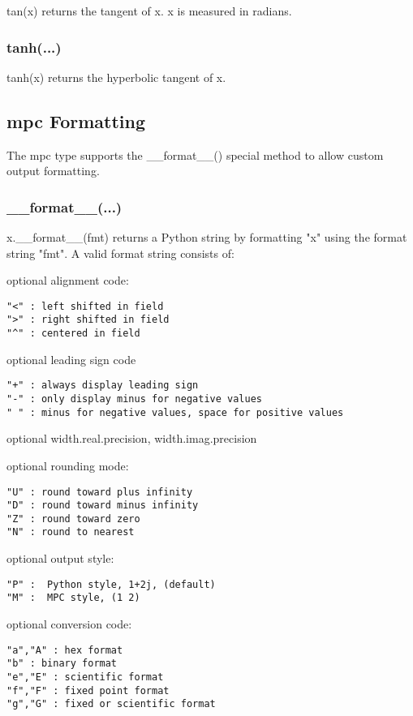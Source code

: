 tan(x) returns the tangent of x. x is measured in radians.

\subsubsection{tanh(...)}

tanh(x) returns the hyperbolic tangent of x.


\subsection{mpc Formatting}

The mpc type supports the \_\_format\_\_() special method to allow custom output formatting.

\subsubsection{\_\_format\_\_(...)}


x.\_\_format\_\_(fmt) returns a Python string by formatting "x" using the format string "fmt". A valid
format string consists of:


optional alignment code:

\begin{lstlisting}
"<" : left shifted in field
">" : right shifted in field
"^" : centered in field
\end{lstlisting}

optional leading sign code
\begin{lstlisting}
"+" : always display leading sign
"-" : only display minus for negative values
" " : minus for negative values, space for positive values
\end{lstlisting}

optional width.real.precision,  width.imag.precision

optional rounding mode:
\begin{lstlisting}
"U" : round toward plus infinity
"D" : round toward minus infinity
"Z" : round toward zero
"N" : round to nearest
\end{lstlisting}

optional output style:
\begin{lstlisting}
"P" :  Python style, 1+2j, (default)
"M" :  MPC style, (1 2)
\end{lstlisting}

optional conversion code:
\begin{lstlisting}
"a","A" : hex format
"b" : binary format
"e","E" : scientific format
"f","F" : fixed point format
"g","G" : fixed or scientific format
\end{lstlisting}


